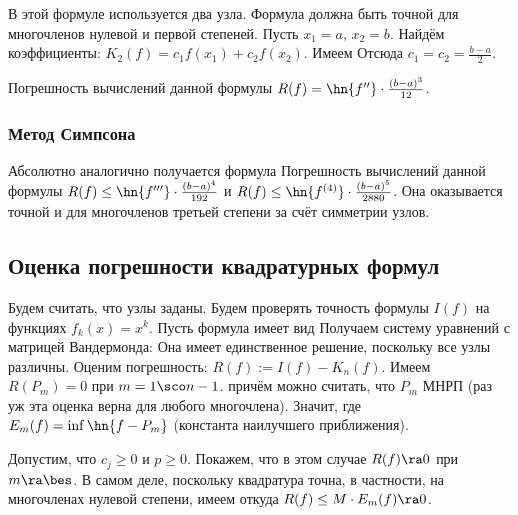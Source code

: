 \documentclass[a4paper]{article}
\begin{document}
В этой формуле используется два узла. Формула должна быть точной для
многочленов нулевой и первой степеней. Пусть $x_1= a$, $x_2 =
b$. Найдём коэффициенты: $K_2(f) = c_1f(x_1) + c_2 f(x_2)$.  Имеем
Отсюда $c_1 = c_2 = \frac{b-a}{2}$.

Погрешность вычислений данной формулы $R(f) = \hn{f''}\cdot
\frac{(b-a)^3}{12}$.

\subsubsection{Метод Симпсона}

Абсолютно аналогично получается формула 
Погрешность вычислений данной формулы $R(f) \le \hn{f'''}\cdot
\frac{(b-a)^4}{192}$ и $R(f) \le \hn{f^{(4)}}\cdot
\frac{(b-a)^5}{2880}$.  Она оказывается точной и для многочленов
третьей степени за счёт симметрии узлов.

\subsection{Оценка погрешности квадратурных формул}

Будем считать, что узлы заданы. Будем проверять точность формулы
$I(f)$ на функциях $f_k(x) = x^k$. Пусть формула имеет вид 
 Получаем систему уравнений с матрицей
Вандермонда:   Она имеет единственное решение,
поскольку все узлы различны.  Оценим погрешность: $R(f) :=
I(f)-K_n(f)$. Имеем $R(P_m) = 0$ при $m=1\sco n-1$.   причём можно считать, что
$P_m$ МНРП (раз уж эта оценка верна для любого многочлена).  Значит,
 где $E_m(f) =
\inf \hn{f - P_m}$ (константа наилучшего приближения).

Допустим, что $c_j \ge 0$ и $p \ge 0$.  Покажем, что в этом случае
$R(f)\ra 0$ при $m\ra \bes$.  В самом деле, поскольку квадратура
точна, в частности, на многочленах нулевой степени, имеем  откуда $R(f) \le M \cdot E_m(f) \ra 0$.
\end{document}
